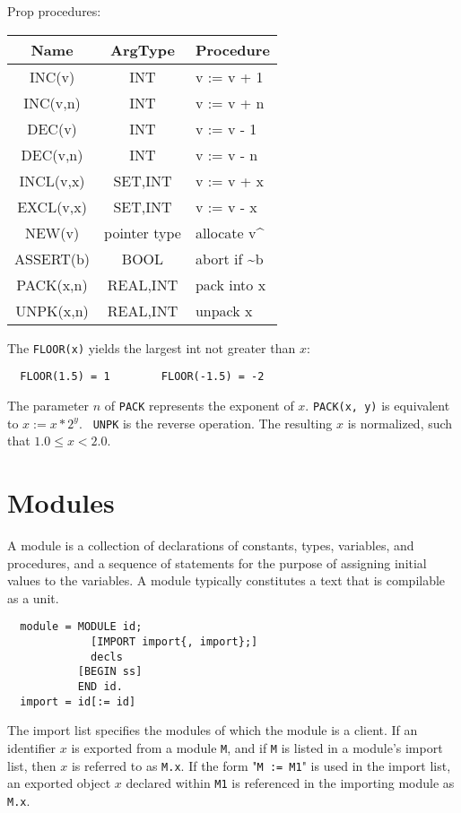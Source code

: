 Prop procedures:
\begin{table}[h!]
  \centering
  \begin{tabular}{c c l}
    Name      & ArgType  & Procedure \\\hline
    INC(v)    & INT      & v := v + 1 \\
    INC(v,n)  & INT      & v := v + n \\
    DEC(v)    & INT      & v := v - 1 \\
    DEC(v,n)  & INT      & v := v - n \\
    INCL(v,x) & SET,INT  & v := v + {x} \\
    EXCL(v,x) & SET,INT  & v := v - {x} \\
    NEW(v)    & pointer type & allocate v\^{} \\
    ASSERT(b) & BOOL     & abort if \~{}b \\
    PACK(x,n) & REAL,INT & pack into x \\
    UNPK(x,n) & REAL,INT & unpack x
  \end{tabular}
\end{table}

The \verb|FLOOR(x)| yields the largest int not greater than $x$:
\begin{verbatim}
  FLOOR(1.5) = 1        FLOOR(-1.5) = -2
\end{verbatim}

The parameter $n$ of \verb|PACK| represents the exponent of $x$. \verb|PACK(x, y)| is
equivalent to $x := x * 2^y$. \verb| UNPK| is the reverse operation. The resulting $x$
is normalized, such that $1.0 \le x < 2.0$.

\section{Modules}
\label{sec:mod}
A module is a collection of declarations of constants, types, variables, and procedures,
and a sequence of statements for the purpose of assigning initial values to the variables.
A module typically constitutes a text that is compilable as a unit.
\begin{verbatim}
  module = MODULE id;
             [IMPORT import{, import};]
             decls
           [BEGIN ss]
           END id.
  import = id[:= id]
\end{verbatim}

The import list specifies the modules of which the module is a client. If an identifier $x$
is exported from a module \verb|M|, and if \verb|M| is listed in a module's import list,
then $x$ is referred to as \verb|M.x|. If the form "\verb|M := M1|" is used in the import
list, an exported object $x$ declared within \verb|M1| is referenced in the importing module
as \verb|M.x|.

